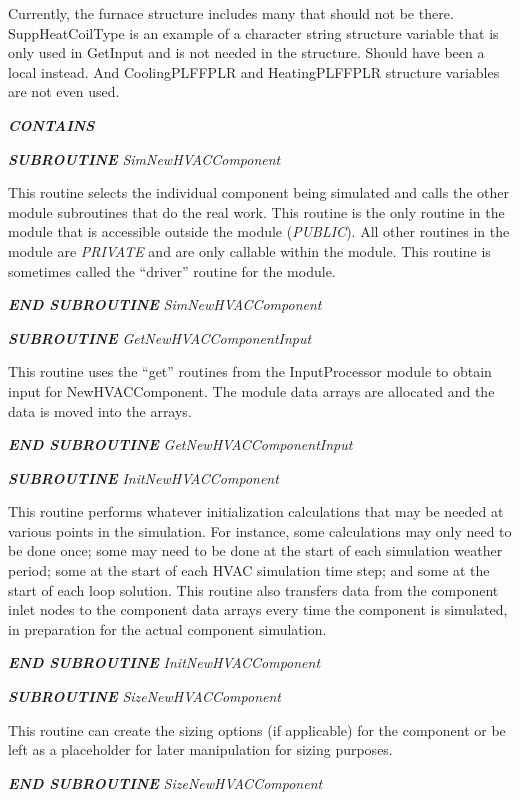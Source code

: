 Currently, the furnace structure includes many that should not be there. SuppHeatCoilType is an example of a character string structure variable that is only used in GetInput and is not needed in the structure. Should have been a local instead. And CoolingPLFFPLR and HeatingPLFFPLR structure variables are not even used.

\textbf{\emph{CONTAINS}}

\textbf{\emph{SUBROUTINE}} \emph{SimNewHVACComponent}

This routine selects the individual component being simulated and calls the other module subroutines that do the real work. This routine is the only routine in the module that is accessible outside the module (\emph{PUBLIC}). All other routines in the module are \emph{PRIVATE} and are only callable within the module. This routine is sometimes called the ``driver'' routine for the module.

\textbf{\emph{END SUBROUTINE}} \emph{SimNewHVACComponent}

\textbf{\emph{SUBROUTINE}} \emph{GetNewHVACComponentInput}

This routine uses the ``get'' routines from the InputProcessor module to obtain input for NewHVACComponent. The module data arrays are allocated and the data is moved into the arrays.

\textbf{\emph{END SUBROUTINE}} \emph{GetNewHVACComponentInput}

\textbf{\emph{SUBROUTINE}} \emph{InitNewHVACComponent}

This routine performs whatever initialization calculations that may be needed at various points in the simulation. For instance, some calculations may only need to be done once; some may need to be done at the start of each simulation weather period; some at the start of each HVAC simulation time step; and some at the start of each loop solution. This routine also transfers data from the component inlet nodes to the component data arrays every time the component is simulated, in preparation for the actual component simulation.

\textbf{\emph{END SUBROUTINE}} \emph{InitNewHVACComponent}

\textbf{\emph{SUBROUTINE}} \emph{SizeNewHVACComponent}

This routine can create the sizing options (if applicable) for the component or be left as a placeholder for later manipulation for sizing purposes.

\textbf{\emph{END SUBROUTINE}} \emph{SizeNewHVACComponent}

